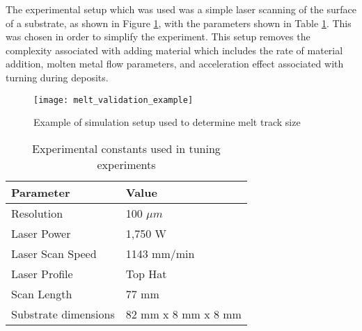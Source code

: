 
The experimental setup which was used was a simple laser scanning of the surface of a substrate, as shown in Figure \ref{fig:melt_validation_example}, with the parameters shown in Table \ref{tab:exp_constants}.  This was chosen in order to simplify the experiment.  This setup removes the complexity associated with adding material which includes the rate of material addition, molten metal flow parameters, and acceleration effect associated with turning during deposits.
\begin{figure}[!htb]
	\centering
	\texttt{[image: melt\_validation\_example]}
	\caption{Example of simulation setup used to determine melt track size}
	\label{fig:melt_validation_example}
\end{figure}
\begin{table}[!htb]
	\centering
	\caption{Experimental constants used in tuning experiments}
	\label{tab:exp_constants}
	\begin{tabular}{|l|l|} \hline
		Parameter & Value \\ \hline
		Resolution & 100 $\mu m$ \\ \hline
		Laser Power & 1,750 W \\ \hline
		Laser Scan Speed & 1143 mm/min \\ \hline
		Laser Profile & Top Hat \\ \hline
		Scan Length & 77 mm \\ \hline
		Substrate dimensions & 82 mm x 8 mm x 8 mm \\ \hline
	\end{tabular}
\end{table}


